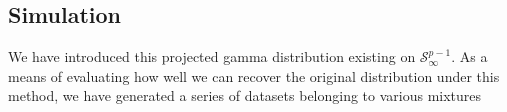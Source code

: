 \subsection{Simulation}
We have introduced this projected gamma distribution existing on $\mathcal{S}_{\infty}^{p-1}$.  As a
  means of evaluating how well we can recover the original distribution under this method, we have
  generated a series of datasets belonging to various mixtures

  \begin{algorithm}[H]
  \for{}
  \end{algorithm}











